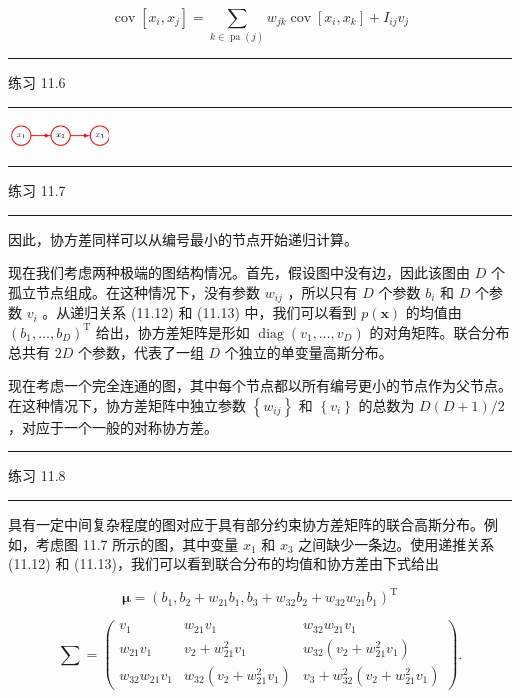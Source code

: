 \documentclass[10pt]{report}
\newcommand{\HRule}{\begin{center}\rule{0.9\linewidth}{0.2mm}\end{center}}
\begin{document}
\[
\operatorname{cov}\left\lbrack  {{x}_{i},{x}_{j}}\right\rbrack   = \mathop{\sum }\limits_{{k \in  \operatorname{pa}\left( j\right) }}{w}_{jk}\operatorname{cov}\left\lbrack  {{x}_{i},{x}_{k}}\right\rbrack   + {I}_{ij}{v}_{j} \tag{11.13}
\]

\HRule

练习 11.6

\HRule

\begin{center}
\includegraphics[max width=0.2\textwidth]{images/0194e279-9b28-703a-88f4-c3ac21e2010d_352_1208_346_334_85_0.jpg}
\end{center}
\hspace*{3em} 

\HRule

练习 11.7

\HRule

因此，协方差同样可以从编号最小的节点开始递归计算。

现在我们考虑两种极端的图结构情况。首先，假设图中没有边，因此该图由 \(D\) 个孤立节点组成。在这种情况下，没有参数 \({w}_{ij}\) ，所以只有 \(D\) 个参数 \({b}_{i}\) 和 \(D\) 个参数 \({v}_{i}\) 。从递归关系 (11.12) 和 (11.13) 中，我们可以看到 \(p\left( \mathbf{x}\right)\) 的均值由 \({\left( {b}_{1},\ldots ,{b}_{D}\right) }^{\mathrm{T}}\) 给出，协方差矩阵是形如 \(\operatorname{diag}\left( {{v}_{1},\ldots ,{v}_{D}}\right)\) 的对角矩阵。联合分布总共有 \({2D}\) 个参数，代表了一组 \(D\) 个独立的单变量高斯分布。

现在考虑一个完全连通的图，其中每个节点都以所有编号更小的节点作为父节点。在这种情况下，协方差矩阵中独立参数 \(\left\{  {w}_{ij}\right\}\) 和 \(\left\{  {v}_{i}\right\}\) 的总数为 \(D\left( {D + 1}\right) /2\) ，对应于一个一般的对称协方差。

\HRule

练习 11.8

\HRule

具有一定中间复杂程度的图对应于具有部分约束协方差矩阵的联合高斯分布。例如，考虑图 11.7 所示的图，其中变量 \({x}_{1}\) 和 \({x}_{3}\) 之间缺少一条边。使用递推关系 (11.12) 和 (11.13)，我们可以看到联合分布的均值和协方差由下式给出

\[
\mathbf{\mu } = {\left( {b}_{1},{b}_{2} + {w}_{21}{b}_{1},{b}_{3} + {w}_{32}{b}_{2} + {w}_{32}{w}_{21}{b}_{1}\right) }^{\mathrm{T}} \tag{11.14}
\]

\[
\mathbf{\sum } = \left( \begin{matrix} {v}_{1} & {w}_{21}{v}_{1} & {w}_{32}{w}_{21}{v}_{1} \\  {w}_{21}{v}_{1} & {v}_{2} + {w}_{21}^{2}{v}_{1} & {w}_{32}\left( {{v}_{2} + {w}_{21}^{2}{v}_{1}}\right) \\  {w}_{32}{w}_{21}{v}_{1} & {w}_{32}\left( {{v}_{2} + {w}_{21}^{2}{v}_{1}}\right) & {v}_{3} + {w}_{32}^{2}\left( {{v}_{2} + {w}_{21}^{2}{v}_{1}}\right)  \end{matrix}\right) . \tag{11.15}
\]
\end{document}
